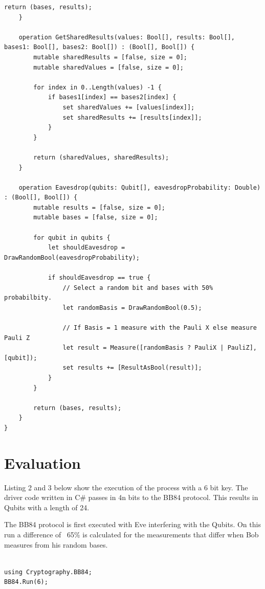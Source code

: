 \documentclass{article}
\begin{document}
\begin{lstlisting}[language={[Sharp]C}, caption={Q\# Microsoft Quantum Development Kit}, label={Script}]
        return (bases, results);
    }

    operation GetSharedResults(values: Bool[], results: Bool[], bases1: Bool[], bases2: Bool[]) : (Bool[], Bool[]) {
        mutable sharedResults = [false, size = 0];
        mutable sharedValues = [false, size = 0];

        for index in 0..Length(values) -1 {
            if bases1[index] == bases2[index] {
                set sharedValues += [values[index]];
                set sharedResults += [results[index]];
            }
        }

        return (sharedValues, sharedResults);
    }

    operation Eavesdrop(qubits: Qubit[], eavesdropProbability: Double) : (Bool[], Bool[]) {
        mutable results = [false, size = 0];
        mutable bases = [false, size = 0];

        for qubit in qubits {
            let shouldEavesdrop = DrawRandomBool(eavesdropProbability);

            if shouldEavesdrop == true {
                // Select a random bit and bases with 50% probabilbity.
                let randomBasis = DrawRandomBool(0.5);

                // If Basis = 1 measure with the Pauli X else measure Pauli Z
                let result = Measure([randomBasis ? PauliX | PauliZ], [qubit]);
                set results += [ResultAsBool(result)];
            }
		}

        return (bases, results);
    }
}

\end{lstlisting}

\section{Evaluation}

Listing 2 and 3 below show the execution of the process with a 6 bit key. The driver code written in C\# passes in 4n bits to the BB84 protocol. This results in Qubits with a length of 24.

The BB84 protocol is first  executed with Eve interfering with the Qubits. On this run a difference of  ~65\% is calculated for the measurements that differ when Bob measures from his random bases.

\begin{lstlisting}[language={[Sharp]C}, caption={C\# Driver code executes process with a 6 bit key}, label={Script}]

using Cryptography.BB84;
BB84.Run(6);

\end{lstlisting}
\end{document}
